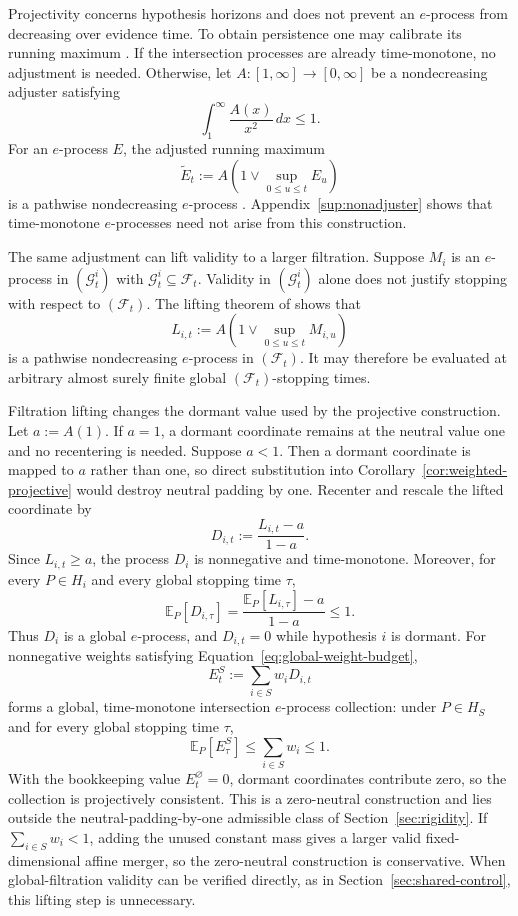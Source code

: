 \documentclass[11pt]{article}
\numberwithin{equation}{section}
\theoremstyle{plain}
\theoremstyle{definition}
\newcommand{\E}{\mathbb E}
\newcommand{\F}{\mathcal F}
\begin{document}
Projectivity concerns hypothesis horizons and does not prevent an $e$-process from decreasing over evidence time. To obtain persistence one may calibrate its running maximum \citep{DawidEtAl2011Evidence,TavyrikovGoemanDeHeide2026}. If the intersection processes are already time-monotone, no adjustment is needed. Otherwise, let $A:[1,\infty]\to[0,\infty]$ be a nondecreasing adjuster satisfying
\begin{equation}\label{eq:adjuster-condition}
  \int_1^\infty\frac{A(x)}{x^2}\,dx\leq1.
\end{equation}
For an $e$-process $E$, the adjusted running maximum
\begin{equation}\label{eq:adjusted-process}
  \widetilde E_t:=A\!\left(1\vee\sup_{0\leq u\leq t}E_u\right)
\end{equation}
is a pathwise nondecreasing $e$-process \citep{DawidEtAl2011Evidence}. Appendix~\ref{sup:nonadjuster} shows that time-monotone $e$-processes need not arise from this construction.

The same adjustment can lift validity to a larger filtration. Suppose $M_i$ is an $e$-process in $(\mathcal G^i_t)$ with $\mathcal G^i_t\subseteq\F_t$. Validity in $(\mathcal G^i_t)$ alone does not justify stopping with respect to $(\F_t)$. The lifting theorem of \citet{ChoeRamdas2026} shows that
\[
  L_{i,t}:=A\!\left(1\vee\sup_{0\leq u\leq t}M_{i,u}\right)
\]
is a pathwise nondecreasing $e$-process in $(\F_t)$. It may therefore be evaluated at arbitrary almost surely finite global $(\F_t)$-stopping times.

Filtration lifting changes the dormant value used by the projective construction. Let $a:=A(1)$. If $a=1$, a dormant coordinate remains at the neutral value one and no recentering is needed. Suppose $a<1$. Then a dormant coordinate is mapped to $a$ rather than one, so direct substitution into Corollary~\ref{cor:weighted-projective} would destroy neutral padding by one. Recenter and rescale the lifted coordinate by
\[
  D_{i,t}:=\frac{L_{i,t}-a}{1-a}.
\]
Since $L_{i,t}\geq a$, the process $D_i$ is nonnegative and time-monotone. Moreover, for every $P\in H_i$ and every global stopping time $\tau$,
\[
  \E_P[D_{i,\tau}]
  =\frac{\E_P[L_{i,\tau}]-a}{1-a}\leq1.
\]
Thus $D_i$ is a global $e$-process, and $D_{i,t}=0$ while hypothesis $i$ is dormant. For nonnegative weights satisfying Equation~\eqref{eq:global-weight-budget},
\[
  E_t^S:=\sum_{i\in S}w_iD_{i,t}
\]
forms a global, time-monotone intersection $e$-process collection: under $P\in H_S$ and for every global stopping time $\tau$,
\[
  \E_P[E_\tau^S]\leq\sum_{i\in S}w_i\leq1.
\]
With the bookkeeping value $E_t^\varnothing=0$, dormant coordinates contribute zero, so the collection is projectively consistent. This is a zero-neutral construction and lies outside the neutral-padding-by-one admissible class of Section~\ref{sec:rigidity}. If $\sum_{i\in S}w_i<1$, adding the unused constant mass gives a larger valid fixed-dimensional affine merger, so the zero-neutral construction is conservative. When global-filtration validity can be verified directly, as in Section~\ref{sec:shared-control}, this lifting step is unnecessary.
\end{document}
